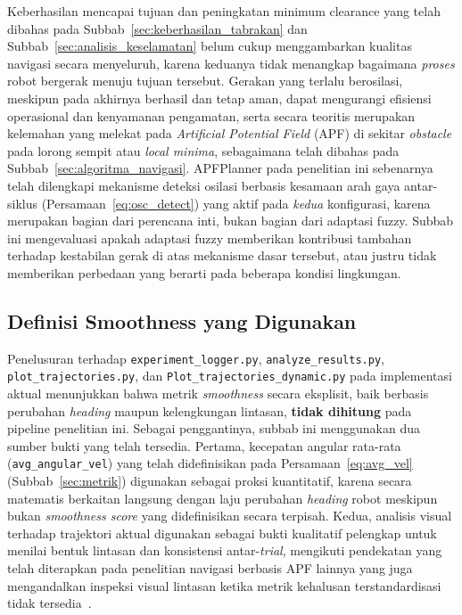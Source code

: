 Keberhasilan mencapai tujuan dan peningkatan minimum clearance yang telah
dibahas pada Subbab~\ref{sec:keberhasilan_tabrakan} dan
Subbab~\ref{sec:analisis_keselamatan} belum cukup menggambarkan kualitas
navigasi secara menyeluruh, karena keduanya tidak menangkap bagaimana
\textit{proses} robot bergerak menuju tujuan tersebut. Gerakan yang terlalu
berosilasi, meskipun pada akhirnya berhasil dan tetap aman, dapat
mengurangi efisiensi operasional dan kenyamanan pengamatan, serta secara
teoritis merupakan kelemahan yang melekat pada \textit{Artificial Potential
Field} (APF) di sekitar \textit{obstacle} pada lorong sempit atau
\textit{local minima}, sebagaimana telah dibahas pada
Subbab~\ref{sec:algoritma_navigasi}. APFPlanner pada penelitian ini
sebenarnya telah dilengkapi mekanisme deteksi osilasi berbasis kesamaan
arah gaya antar-siklus (Persamaan~\ref{eq:osc_detect}) yang aktif pada
\textit{kedua} konfigurasi, karena merupakan bagian dari perencana inti,
bukan bagian dari adaptasi fuzzy. Subbab ini mengevaluasi apakah adaptasi
fuzzy memberikan kontribusi tambahan terhadap kestabilan gerak di atas
mekanisme dasar tersebut, atau justru tidak memberikan perbedaan yang
berarti pada beberapa kondisi lingkungan.

\subsection{Definisi Smoothness yang Digunakan}

Penelusuran terhadap \texttt{experiment\_logger.py}, \texttt{analyze\_results.py},
\texttt{plot\_trajectories.py}, dan \texttt{Plot\_trajectories\_dynamic.py}
pada implementasi aktual menunjukkan bahwa metrik \textit{smoothness} secara
eksplisit, baik berbasis perubahan \textit{heading} maupun kelengkungan
lintasan, \textbf{tidak dihitung} pada pipeline penelitian ini. Sebagai
penggantinya, subbab ini menggunakan dua sumber bukti yang telah tersedia.
Pertama, kecepatan angular rata-rata (\texttt{avg\_angular\_vel}) yang telah
didefinisikan pada Persamaan~\ref{eq:avg_vel} (Subbab~\ref{sec:metrik})
digunakan sebagai proksi kuantitatif, karena secara matematis berkaitan
langsung dengan laju perubahan \textit{heading} robot meskipun bukan
\textit{smoothness score} yang didefinisikan secara terpisah. Kedua,
analisis visual terhadap trajektori aktual digunakan sebagai bukti
kualitatif pelengkap untuk menilai bentuk lintasan dan konsistensi
antar-\textit{trial}, mengikuti pendekatan yang telah diterapkan pada
penelitian navigasi berbasis APF lainnya yang juga mengandalkan inspeksi
visual lintasan ketika metrik kehalusan terstandardisasi tidak
tersedia~\cite{Lv2024}.

